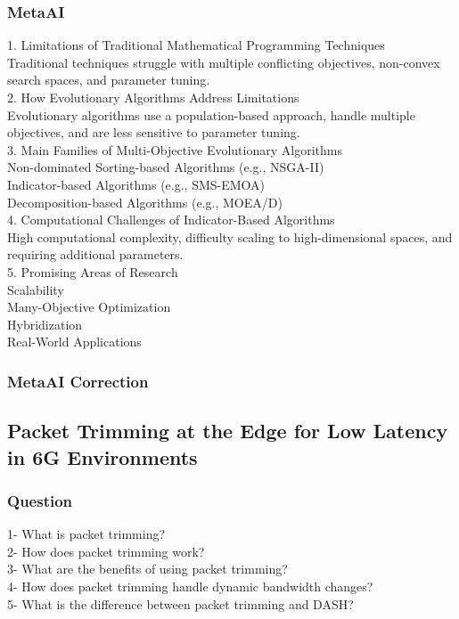 \subsubsection{MetaAI}
\begin{tcolorbox}[breakable]
1. Limitations of Traditional Mathematical Programming Techniques\\
Traditional techniques struggle with multiple conflicting objectives, non-convex search spaces, and parameter tuning.\\
2. How Evolutionary Algorithms Address Limitations\\
Evolutionary algorithms use a population-based approach, handle multiple objectives, and are less sensitive to parameter tuning.\\
3. Main Families of Multi-Objective Evolutionary Algorithms\\
Non-dominated Sorting-based Algorithms (e.g., NSGA-II)\\
Indicator-based Algorithms (e.g., SMS-EMOA)\\
Decomposition-based Algorithms (e.g., MOEA/D)\\
4. Computational Challenges of Indicator-Based Algorithms\\
High computational complexity, difficulty scaling to high-dimensional spaces, and requiring additional parameters.\\
5. Promising Areas of Research\\
Scalability\\
Many-Objective Optimization\\
Hybridization\\
Real-World Applications\\
\end{tcolorbox}
\subsubsection{MetaAI Correction}
\begin{tcolorbox}[breakable]
    
\end{tcolorbox}


\subsection{Packet Trimming at the Edge for Low Latency in 6G Environments}
\subsubsection{Question}
\begin{tcolorbox}[breakable]
    1- What is packet trimming?\\
2- How does packet trimming work?\\
3- What are the benefits of using packet trimming?\\
4- How does packet trimming handle dynamic bandwidth changes?\\
5- What is the difference between packet trimming and DASH?\\

\end{tcolorbox}

